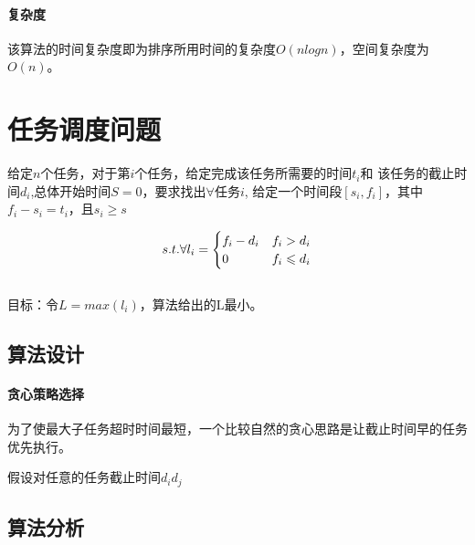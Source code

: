 \paragraph*{复杂度}
该算法的时间复杂度即为排序所用时间的复杂度$O(nlogn)$，空间复杂度为$O(n)$。

\section{任务调度问题}
\begin{example}
	给定$n$个任务，对于第$i$个任务，给定完成该任务所需要的时间$t_i$和
	该任务的截止时间$d_i$,总体开始时间$S=0$，要求找出$\forall$任务$i$,
	给定一个时间段$[s_i,f_i]$，其中$f_i - s_i = t_i$，且$s_i\geqslant s$

	\begin{equation}
		s.t. \forall \space l_i = \begin{cases}
			f_i - d_i & f_i > d_i    \\
			0        & f_i \leqslant d_i
		\end{cases}
	\end{equation}
	\\目标：令$L=max(l_i)$，算法给出的L最小。
\end{example}

\subsection{算法设计}
\paragraph*{贪心策略选择}
为了使最大子任务超时时间最短，一个比较自然的贪心思路是让截止时间早的任务优先执行。

\begin{remark}
    假设对任意的任务截止时间$d_i$\neq$d_j$
\end{remark}

\subsection{算法分析}

